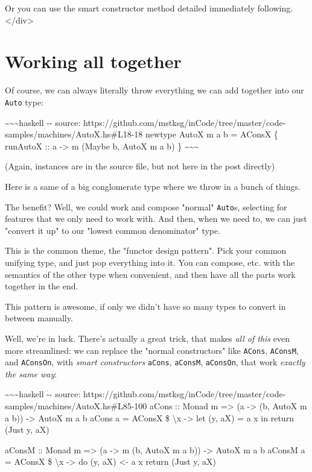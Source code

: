 \documentclass[]{article}
\begin{document}
Or you can use the smart constructor method detailed immediately following.
\textless{}/div\textgreater{}

\section{Working all together}

Of course, we can always literally throw everything we can add together into our
\texttt{Auto} type:

\textasciitilde{}\textasciitilde{}\textasciitilde{}haskell -\/- source:
https://github.com/mstksg/inCode/tree/master/code-samples/machines/AutoX.hs\#L18-18
newtype AutoX m a b = AConsX \{ runAutoX :: a -\textgreater{} m (Maybe b, AutoX
m a b) \} \textasciitilde{}\textasciitilde{}\textasciitilde{}

(Again, instances are in the source file, but not here in the post directly)

Here is a same of a big conglomerate type where we throw in a bunch of things.

The benefit? Well, we could work and compose "normal" \texttt{Auto}s, selecting
for features that we only need to work with. And then, when we need to, we can
just "convert it up" to our "lowest common denominator" type.

This is the common theme, the "functor design pattern". Pick your common
unifying type, and just pop everything into it. You can compose, etc. with the
semantics of the other type when convenient, and then have all the parts work
together in the end.

This pattern is awesome, if only we didn't have so many types to convert in
between manually.

Well, we're in luck. There's actually a great trick, that makes \emph{all of
this} even more streamlined: we can replace the "normal constructors" like
\texttt{ACons}, \texttt{AConsM}, and \texttt{AConsOn}, with \emph{smart
constructors} \texttt{aCons}, \texttt{aConsM}, \texttt{aConsOn}, that work
\emph{exactly the same way}:

\textasciitilde{}\textasciitilde{}\textasciitilde{}haskell -\/- source:
https://github.com/mstksg/inCode/tree/master/code-samples/machines/AutoX.hs\#L85-100
aCons :: Monad m =\textgreater{} (a -\textgreater{} (b, AutoX m a b))
-\textgreater{} AutoX m a b aCons a = AConsX \$ \textbackslash{}x
-\textgreater{} let (y, aX) = a x in return (Just y, aX)

aConsM :: Monad m =\textgreater{} (a -\textgreater{} m (b, AutoX m a b))
-\textgreater{} AutoX m a b aConsM a = AConsX \$ \textbackslash{}x
-\textgreater{} do (y, aX) \textless{}- a x return (Just y, aX)
\end{document}
